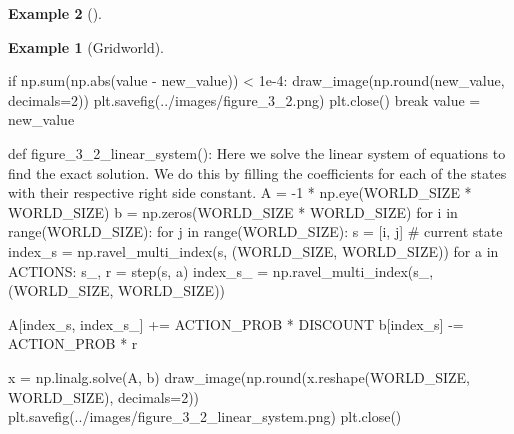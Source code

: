\documentclass[
  letterpaper,
]{krantz}
\makeatletter
\newenvironment{Shaded}{\begin{snugshade}}{\end{snugshade}}
\newcommand{\BuiltInTok}[1]{\textcolor[rgb]{0.00,0.23,0.31}{#1}}
\newcommand{\CommentTok}[1]{\textcolor[rgb]{0.37,0.37,0.37}{#1}}
\newcommand{\ControlFlowTok}[1]{\textcolor[rgb]{0.00,0.23,0.31}{#1}}
\newcommand{\DecValTok}[1]{\textcolor[rgb]{0.68,0.00,0.00}{#1}}
\newcommand{\FloatTok}[1]{\textcolor[rgb]{0.68,0.00,0.00}{#1}}
\newcommand{\KeywordTok}[1]{\textcolor[rgb]{0.00,0.23,0.31}{#1}}
\newcommand{\NormalTok}[1]{\textcolor[rgb]{0.00,0.23,0.31}{#1}}
\newcommand{\OperatorTok}[1]{\textcolor[rgb]{0.37,0.37,0.37}{#1}}
\newcommand{\StringTok}[1]{\textcolor[rgb]{0.13,0.47,0.30}{#1}}
\newenvironment{kframe}{%
\medskip{}
\setlength{\fboxsep}{.8em}
 \def\at@end@of@kframe{}%
 \ifinner\ifhmode%
  \def\at@end@of@kframe{\end{minipage}}%
  \begin{minipage}{\columnwidth}%
 \fi\fi%
 \def\FrameCommand##1{\hskip\@totalleftmargin \hskip-\fboxsep
 \colorbox{shadecolor}{##1}\hskip-\fboxsep
     \hskip-\linewidth \hskip-\@totalleftmargin \hskip\columnwidth}%
 \MakeFramed {\advance\hsize-\width
   \@totalleftmargin\z@ \linewidth\hsize
   \@setminipage}}%
 {\par\unskip\endMakeFramed%
 \at@end@of@kframe}
\renewenvironment{Shaded}{\begin{kframe}}{\end{kframe}}
\theoremstyle{plain}
\theoremstyle{definition}
\newtheorem{example}{Example}[chapter]
\theoremstyle{definition}
\theoremstyle{remark}
\makeatother
\begin{document}
\begin{example}[]
\begin{example}[Gridworld]
\begin{tcolorbox}[enhanced jigsaw, bottomrule=.15mm, opacityback=0, breakable, colframe=quarto-callout-tip-color-frame, left=2mm, rightrule=.15mm, toprule=.15mm, leftrule=.75mm, arc=.35mm, colback=white]
\begin{codelisting}[H]
\begin{Shaded}
\begin{Highlighting}[]
        \ControlFlowTok{if}\NormalTok{ np.}\BuiltInTok{sum}\NormalTok{(np.}\BuiltInTok{abs}\NormalTok{(value }\OperatorTok{{-}}\NormalTok{ new\_value)) }\OperatorTok{\textless{}} \FloatTok{1e{-}4}\NormalTok{:}
\NormalTok{            draw\_image(np.}\BuiltInTok{round}\NormalTok{(new\_value, decimals}\OperatorTok{=}\DecValTok{2}\NormalTok{))}
\NormalTok{            plt.savefig(}\StringTok{\textquotesingle{}../images/figure\_3\_2.png\textquotesingle{}}\NormalTok{)}
\NormalTok{            plt.close()}
            \ControlFlowTok{break}
\NormalTok{        value }\OperatorTok{=}\NormalTok{ new\_value}

\KeywordTok{def}\NormalTok{ figure\_3\_2\_linear\_system():}
    \CommentTok{\textquotesingle{}\textquotesingle{}\textquotesingle{}}
\CommentTok{    Here we solve the linear system of equations to find the exact solution.}
\CommentTok{    We do this by filling the coefficients for each of the states with their respective right side constant.}
\CommentTok{    \textquotesingle{}\textquotesingle{}\textquotesingle{}}
\NormalTok{    A }\OperatorTok{=} \OperatorTok{{-}}\DecValTok{1} \OperatorTok{*}\NormalTok{ np.eye(WORLD\_SIZE }\OperatorTok{*}\NormalTok{ WORLD\_SIZE)}
\NormalTok{    b }\OperatorTok{=}\NormalTok{ np.zeros(WORLD\_SIZE }\OperatorTok{*}\NormalTok{ WORLD\_SIZE)}
    \ControlFlowTok{for}\NormalTok{ i }\KeywordTok{in} \BuiltInTok{range}\NormalTok{(WORLD\_SIZE):}
        \ControlFlowTok{for}\NormalTok{ j }\KeywordTok{in} \BuiltInTok{range}\NormalTok{(WORLD\_SIZE):}
\NormalTok{            s }\OperatorTok{=}\NormalTok{ [i, j]  }\CommentTok{\# current state}
\NormalTok{            index\_s }\OperatorTok{=}\NormalTok{ np.ravel\_multi\_index(s, (WORLD\_SIZE, WORLD\_SIZE))}
            \ControlFlowTok{for}\NormalTok{ a }\KeywordTok{in}\NormalTok{ ACTIONS:}
\NormalTok{                s\_, r }\OperatorTok{=}\NormalTok{ step(s, a)}
\NormalTok{                index\_s\_ }\OperatorTok{=}\NormalTok{ np.ravel\_multi\_index(s\_, (WORLD\_SIZE, WORLD\_SIZE))}

\NormalTok{                A[index\_s, index\_s\_] }\OperatorTok{+=}\NormalTok{ ACTION\_PROB }\OperatorTok{*}\NormalTok{ DISCOUNT}
\NormalTok{                b[index\_s] }\OperatorTok{{-}=}\NormalTok{ ACTION\_PROB }\OperatorTok{*}\NormalTok{ r}

\NormalTok{    x }\OperatorTok{=}\NormalTok{ np.linalg.solve(A, b)}
\NormalTok{    draw\_image(np.}\BuiltInTok{round}\NormalTok{(x.reshape(WORLD\_SIZE, WORLD\_SIZE), decimals}\OperatorTok{=}\DecValTok{2}\NormalTok{))}
\NormalTok{    plt.savefig(}\StringTok{\textquotesingle{}../images/figure\_3\_2\_linear\_system.png\textquotesingle{}}\NormalTok{)}
\NormalTok{    plt.close()}


\end{Highlighting}
\end{Shaded}
\end{codelisting}
\end{tcolorbox}
\end{example}
\end{example}
\end{document}
